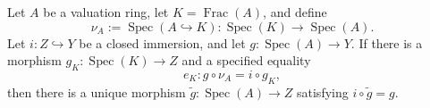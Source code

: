 \begin{lemma}
  \label{lemma:nagata-valuation-factor-closed}

  Let $A$ be a valuation ring, let $K=\operatorname{Frac}(A)$, and define
  \[
    \nu_A:=\operatorname{Spec}(A\hookrightarrow K)
      \colon\operatorname{Spec}(K)\to\operatorname{Spec}(A).
  \]
  Let $i\colon Z\hookrightarrow Y$ be a closed
  immersion, and let $g\colon\operatorname{Spec}(A)\to Y$.  If there is a
  morphism $g_K\colon\operatorname{Spec}(K)\to Z$ and a specified equality
  \[
    e_K\colon g\circ\nu_A=i\circ g_K,
  \]
  then there is a unique morphism
  $\widetilde g\colon\operatorname{Spec}(A)\to Z$ satisfying
  $i\circ\widetilde g=g$.
\end{lemma}

